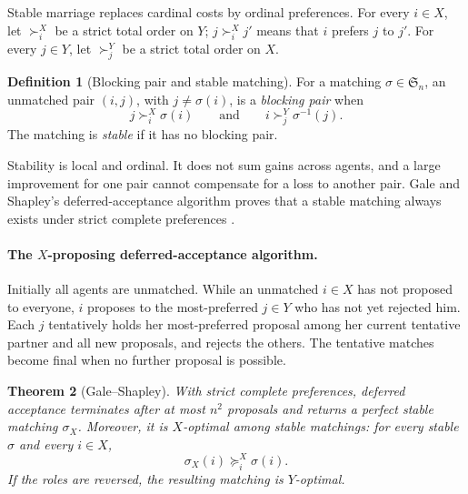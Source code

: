 \documentclass[11pt]{article}
\newtheorem{theorem}{Theorem}[section]
\theoremstyle{definition}
\newtheorem{definition}[theorem]{Definition}
\theoremstyle{remark}
\newcommand{\Perm}{\mathfrak S}
\begin{document}
Stable marriage replaces cardinal costs by ordinal preferences. For every
\(i\in X\), let \(\succ_i^X\) be a strict total order on \(Y\);
\(j\succ_i^X j'\) means that \(i\) prefers \(j\) to \(j'\). For every
\(j\in Y\), let \(\succ_j^Y\) be a strict total order on \(X\).

\begin{definition}[Blocking pair and stable matching]\label{def:stable}
For a matching \(\sigma\in\Perm_n\), an unmatched pair \((i,j)\), with
\(j\neq\sigma(i)\), is a \emph{blocking pair} when
\begin{equation}\label{eq:blocking-pair}
  j\succ_i^X\sigma(i)
  \qquad\text{and}\qquad
  i\succ_j^Y\sigma^{-1}(j).
\end{equation}
The matching is \emph{stable} if it has no blocking pair.
\end{definition}

Stability is local and ordinal. It does not sum gains across agents, and a
large improvement for one pair cannot compensate for a loss to another pair.
Gale and Shapley's deferred-acceptance algorithm proves that a stable matching
always exists under strict complete preferences \citep{GaleShapley1962}.

\paragraph{The \(X\)-proposing deferred-acceptance algorithm.}
Initially all agents are unmatched. While an unmatched \(i\in X\) has not
proposed to everyone, \(i\) proposes to the most-preferred \(j\in Y\) who has
not yet rejected him. Each \(j\) tentatively holds her most-preferred proposal
among her current tentative partner and all new proposals, and rejects the
others. The tentative matches become final when no further proposal is
possible.

\begin{theorem}[Gale--Shapley]\label{thm:gale-shapley}
With strict complete preferences, deferred acceptance terminates after at most
\(n^2\) proposals and returns a perfect stable matching \(\sigma_X\). Moreover,
it is \(X\)-optimal among stable matchings: for every stable \(\sigma\) and
every \(i\in X\),
\begin{equation}\label{eq:proposer-optimal}
  \sigma_X(i)\succeq_i^X\sigma(i).
\end{equation}
If the roles are reversed, the resulting matching is \(Y\)-optimal.
\end{theorem}
\end{document}
